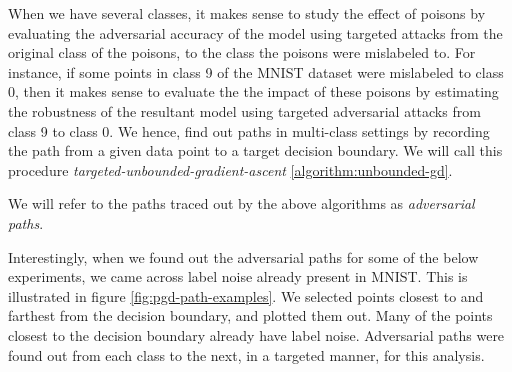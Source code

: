\documentclass{ociamthesis}
\begin{document}
When we have several classes, it makes sense to study the effect of poisons by
evaluating the adversarial accuracy of the model using targeted attacks from the
original class of the poisons, to the class the poisons were mislabeled to. For
instance, if some points in class 9 of the MNIST dataset were mislabeled to
class 0, then it makes sense to evaluate the the impact of these poisons by
estimating the robustness of the resultant model using targeted adversarial
attacks from class 9 to class 0. We hence, find out paths in multi-class
settings by recording the path from a given data point to a target decision
boundary. We will call this procedure \emph{targeted-unbounded-gradient-ascent}
\ref{algorithm:unbounded-gd}.

We will refer to the paths traced out by the above algorithms as
\emph{adversarial paths}.

Interestingly, when we found out the adversarial paths for some of the below
experiments, we came across label noise already present in MNIST. This is
illustrated in figure \ref{fig:pgd-path-examples}. We selected points closest to
and farthest from the decision boundary, and plotted them out. Many of the
points closest to the decision boundary already have label noise. Adversarial
paths were found out from each class to the next, in a targeted manner, for this
analysis.
\end{document}
